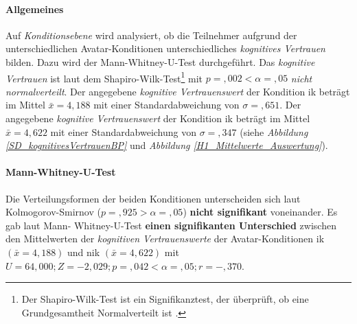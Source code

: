 \documentclass[a4paper,11pt]{article}%
\renewcommand{\\}{\vspace*{0.5\baselineskip} \newline}
\begin{document}
{{{{{{\paragraph{Allgemeines}
Auf \textit{Konditionsebene} wird analysiert, ob die Teilnehmer aufgrund der unterschiedlichen Avatar-Konditionen unterschiedliches \textit{kognitives Vertrauen} bilden. Dazu wird der Mann-Whitney-U-Test durchgeführt.\\
Das \textit{kognitive Vertrauen} ist laut dem Shapiro-Wilk-Test\footnote{Der Shapiro-Wilk-Test ist ein Signifikanztest, der überprüft, ob eine Grundgesamtheit Normalverteilt ist \citep[S. 25]{razali2011power}.} mit $p =,002 < \alpha =,05$ \textit{nicht normalverteilt}.
Der angegebene \textit{kognitive Vertrauenswert} der Kondition \ac{ik} beträgt im Mittel $\bar{x} = 4,188$ mit einer Standardabweichung von $\sigma =,651$.\newline 
Der angegebene \textit{kognitive Vertrauenswert} der Kondition \ac{ik} beträgt im Mittel $\bar{x} = 4,622$ mit einer Standardabweichung von $\sigma =,347$ (siehe \textit{Abbildung \ref{SD_kognitivesVertrauenBP}} und \textit{Abbildung \ref{H1_Mittelwerte_Auswertung}}).

\paragraph{Mann-Whitney-U-Test}
Die Verteilungsformen der beiden Konditionen unterscheiden sich laut Kolmogorov-Smirnov ($p =,925 > \alpha =,05$) \textbf{nicht signifikant} voneinander. Es gab laut Mann- Whitney-U-Test \textbf{einen signifikanten Unterschied} zwischen den Mittelwerten der \textit{kognitiven Vertrauenswerte} der Avatar-Konditionen \ac{ik} $(\bar{x} = 4,188)$ und \ac{nik} $(\bar{x} = 4,622)$ mit $U = 64,000; Z = -2,029; p =,042 < \alpha =,05; r =-,370$. \\

}}}}}}
\end{document}
